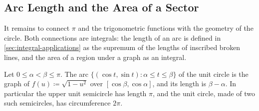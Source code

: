 \begin{table}
\end{table}

\subsection{Arc Length and the Area of a Sector}

It remains to connect $\pi$ and the trigonometric functions with the geometry of the circle. Both connections are integrals: the length of an arc is defined in \cref{sec:integral-applications} as the supremum of the lengths of inscribed broken lines, and the area of a region under a graph as an integral.

\begin{proposition}
\label{prop:arc-length}
Let $0\le\alpha<\beta\le\pi$. The arc $\{(\cos t,\sin t): \alpha\le t\le\beta\}$ of the unit circle is the graph of $f(u)\coloneqq\sqrt{1-u^2}$ over $[\cos\beta,\cos\alpha]$, and its length is $\beta-\alpha$. In particular the upper unit semicircle has length $\pi$, and the unit circle, made of two such semicircles, has circumference $2\pi$.
\end{proposition}

